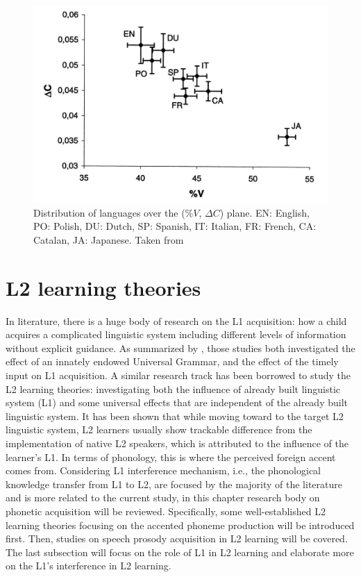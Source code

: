 \begin{figure}
\centering
\captionsetup{justification=centering}
\includegraphics[width = 0.8\linewidth]{figures/ramus_paper.JPG}
\caption{Distribution of languages over the ($\%V$, $\Delta C$) plane. EN: English, PO: Polish, DU: Dutch, SP: Spanish, IT: Italian, FR: French, CA: Catalan, JA: Japanese. Taken from \citep{ramus1999correlates}}
\label{fig:rhythm_lang}
\end{figure}

\section{L2 learning theories}

In literature, there is a huge body of research on the L1 acquisition: how a child acquires a complicated linguistic system including different levels of information without explicit guidance. As summarized by \cite{chang2010first}, those studies both investigated the effect of an innately endowed Universal Grammar, and the effect of the timely input on L1 acquisition. A similar research track has been borrowed to study the L2 learning theories: investigating both the influence of already built linguistic system (L1) and some universal effects that are independent of the already built linguistic system. It has been shown that while moving toward to the target L2 linguistic system, L2 learners usually show trackable difference from the implementation of native L2 speakers, which is attributed to the influence of the learner's L1. In terms of phonology, this is where the perceived foreign accent comes from. Considering L1 interference mechanism, i.e., the phonological knowledge transfer from L1 to L2, are focused by the majority of the literature and is more related to the current study, in this chapter research body on phonetic acquisition will be reviewed. Specifically, some well-established L2 learning theories focusing on the accented phoneme production will be introduced first. Then, studies on speech prosody acquisition in L2 learning will be covered. The last subsection will focus on the role of L1 in L2 learning and elaborate more on the L1's interference in L2 learning.

